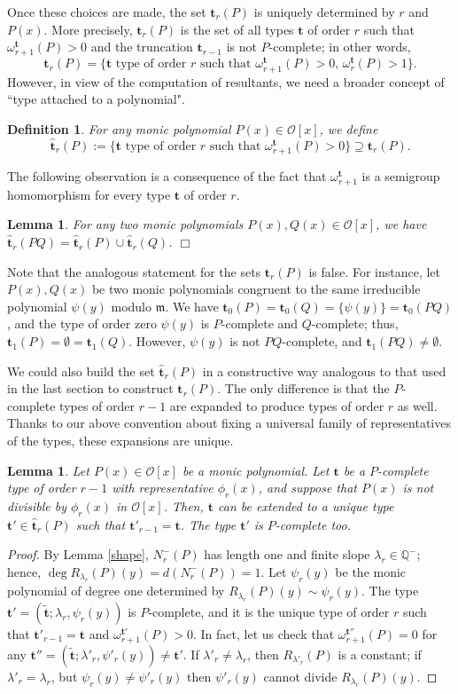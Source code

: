 \documentclass{amsart}
\newtheorem{lemma}[theorem]{Lemma}
\newtheorem{definition}[theorem]{Definition}
\newcommand{\Q}{\mathbb Q}
\def\op{\operatorname}
\def\dg{\op{deg}}
\def\la{\lambda}
\def\m{{\mathfrak m}}
\def\om{\omega}
\def\oo{{\mathcal O}}
\def\tt{\hat{\mathbf{t}}}
\def\ty{\mathbf{t}}
\def\zpx{\oo[x]}
\begin{document}
Once these choices are made, the set $\ty_r(P)$ is uniquely determined by $r$ and $P(x)$. More precisely, $\ty_r(P)$ is the set of all types $\ty$ of order $r$ such that $\om_{r+1}^{\ty}(P)>0$ and the truncation $\ty_{r-1}$ is not $P$-complete; in other words,
$$\ty_r(P)=\{\ty\mbox{ type of order $r$ such that }\om_{r+1}^{\ty}(P)>0,\,\om_r^{\ty}(P)>1\}.
$$However, in view of the computation of resultants, we need a broader concept of ``type attached to a polynomial".

\begin{definition}
For any monic polynomial $P(x)\in\zpx$, we define $$\tt_r(P):=\{\ty\mbox{ type of order $r$ such that }\om_{r+1}^{\ty}(P)>0\}\supseteq \ty_r(P).
$$
\end{definition}

The following observation is a consequence of the fact that $\om_{r+1}^{\ty}$ is a semigroup homomorphism for every type $\ty$ of order $r$. 
\begin{lemma}\label{tunion}
For any two monic polynomials $P(x),Q(x)\in\zpx$, we have $\tt_r(PQ)=\tt_r(P)\cup \tt_r(Q)$.
\hfill{$\Box$}\end{lemma}

Note that the analogous statement for the sets $\ty_r(P)$ is false. For instance, let $P(x),Q(x)$ be two monic polynomials congruent to the same irreducible polynomial $\psi(y)$ modulo $\m$. We have $\ty_0(P)=\ty_0(Q)=\{\psi(y)\}=\ty_0(PQ)$, and the type of order zero $\psi(y)$ is $P$-complete and $Q$-complete; thus, $\ty_1(P)=\emptyset=\ty_1(Q)$. However, $\psi(y)$ is not $PQ$-complete, and $\ty_1(PQ)\ne\emptyset$.  

We could also build the set $\tt_r(P)$ in a constructive way analogous to that used in the last section to construct $\ty_r(P)$. The only difference is that the $P$-complete types of order $r-1$ are expanded to produce types of order $r$ as well. 
Thanks to our above convention 
about fixing a universal family of representatives of the types, these expansions are unique.

\begin{lemma}\label{uniquesprout}
Let $P(x)\in\zpx$ be a monic polynomial. Let $\ty$ be a $P$-complete type of order $r-1$ with representative $\phi_r(x)$, and suppose that $P(x)$ is not divisible by $\phi_r(x)$ in $\zpx$. Then, $\ty$ can be extended to a unique type $\ty'\in\tt_r(P)$ such that $\ty'_{r-1}=\ty$. The type $\ty'$ is $P$-complete too.  
\end{lemma}

\begin{proof}
By Lemma \ref{shape}, $N_r^-(P)$ has length one and finite slope $\la_r\in\Q^-$; hence, $\dg R_{\la_r}(P)(y)=d(N_r^-(P))=1$. Let $\psi_r(y)$ be the monic polynomial of degree one determined by $R_{\la_r}(P)(y)\sim \psi_r(y)$. The type $\ty'=(\tilde{\ty};\la_r,\psi_r(y))$ is $P$-complete, and it is the unique type of order $r$ such that $\ty'_{r-1}=\ty$ and $\om_{r+1}^{\ty'}(P)>0$. In fact, let us check that $\om_{r+1}^{\ty''}(P)=0$ for any $\ty''=(\tilde{\ty};\la'_r,\psi'_r(y))\ne \ty'$.
If $\la'_r\ne\la_r$, then $R_{\la'_r}(P)$ is a constant; if $\la'_r=\la_r$, but $\psi_r(y)\ne \psi'_r(y)$ then $\psi'_r(y)$ cannot divide $R_{\la_r}(P)(y)$.
\end{proof}
\end{document}
